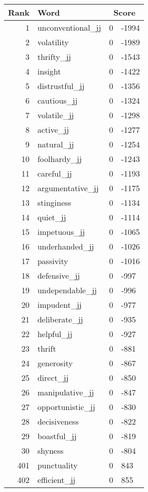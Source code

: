 \begin{longtable}[!htbp]{| rlr@{.}l |}
    \hline
    \textbf{Rank} & \textbf{Word} & \multicolumn{2}{c|}{\textbf{Score}} \\
    \hline
    \endhead
    1 & unconventional\_jj & 0 & -1994 \\
    2 & volatility & 0 & -1989 \\
    3 & thrifty\_jj & 0 & -1543 \\
    4 & insight & 0 & -1422 \\
    5 & distrustful\_jj & 0 & -1356 \\
    6 & cautious\_jj & 0 & -1324 \\
    7 & volatile\_jj & 0 & -1298 \\
    8 & active\_jj & 0 & -1277 \\
    9 & natural\_jj & 0 & -1254 \\
    10 & foolhardy\_jj & 0 & -1243 \\
    11 & careful\_jj & 0 & -1193 \\
    12 & argumentative\_jj & 0 & -1175 \\
    13 & stinginess & 0 & -1134 \\
    14 & quiet\_jj & 0 & -1114 \\
    15 & impetuous\_jj & 0 & -1065 \\
    16 & underhanded\_jj & 0 & -1026 \\
    17 & passivity & 0 & -1016 \\
    18 & defensive\_jj & 0 & -997 \\
    19 & undependable\_jj & 0 & -996 \\
    20 & impudent\_jj & 0 & -977 \\
    21 & deliberate\_jj & 0 & -935 \\
    22 & helpful\_jj & 0 & -927 \\
    23 & thrift & 0 & -881 \\
    24 & generosity & 0 & -867 \\
    25 & direct\_jj & 0 & -850 \\
    26 & manipulative\_jj & 0 & -847 \\
    27 & opportunistic\_jj & 0 & -830 \\
    28 & decisiveness & 0 & -822 \\
    29 & boastful\_jj & 0 & -819 \\
    30 & shyness & 0 & -804 \\
    401 & punctuality & 0 & 843 \\
    402 & efficient\_jj & 0 & 855 \\

\end{longtable}
